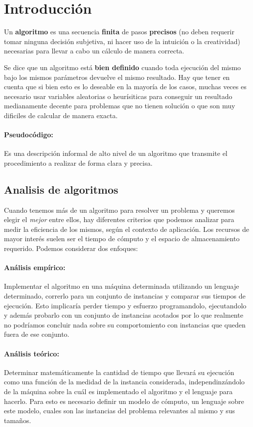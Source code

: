 \section{Introducción}
Un \textbf{algoritmo} es una secuencia \textbf{finita} de pasos  \textbf{precisos} (no deben requerir tomar ninguna decisión subjetiva, ni hacer uso de la intuición o la creatividad) necesarias para llevar a cabo un cálculo de manera correcta.

Se dice que un algoritmo está \textbf{bien definido} cuando toda ejecución del mismo bajo los mismos parámetros devuelve el mismo resultado. Hay que tener en cuenta que si bien esto es lo deseable en la mayoría de los casos, muchas veces es necesario usar variables aleatorias o heurísiticas para conseguir un resultado medianamente decente para problemas que no tienen solución o que son muy dificiles de calcular de manera exacta.

\paragraph{Pseudocódigo:} Es una descripción informal de alto nivel de un algoritmo que transmite el procedimiento a realizar de forma clara y precisa.

\subsection{Analisis de algoritmos}
Cuando tenemos más de un algoritmo para resolver un problema y queremos elegir el \textit{mejor} entre ellos, hay diferentes criterios que podemos analizar para medir la eficiencia de los mismos, según el contexto de aplicación. Los recursos de mayor interés suelen ser el tiempo de cómputo y el espacio de almacenamiento requerido. Podemos considerar dos enfoques:

\paragraph{Análisis empírico:} Implementar el algoritmo en una máquina determinada utilizando un lenguaje determinado, correrlo para un conjunto de instancias y comparar sus tiempos de ejecución. Esto implicaría perder tiempo y esfuerzo programandolo, ejecutandolo y además probarlo con un conjunto de instancias acotados por lo que realmente no podríamos concluir nada sobre su comportomiento con instancias que queden fuera de ese conjunto.

\paragraph{Análisis teórico:} Determinar matemáticamente la cantidad de tiempo que llevará su ejecución como una función de la medidad de la instancia considerada, independinzándolo de la máquina sobre la cuál es implementado el algoritmo y el lenguaje para hacerlo. Para esto es necesario definir un modelo de cómputo, un lenguaje sobre este modelo, cuales son las instancias del problema relevantes al mismo y sus tamaños.

